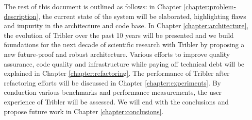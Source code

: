 The rest of this document is outlined as follows: in Chapter \ref{chapter:problem-description}, the current state of the system will be elaborated, highlighting flaws and impurity in the architecture and code base. 
In Chapter \ref{chapter:architecture}, the evolution of Tribler over the past 10 years will be presented and we build foundations for the next decade of scientific research with Tribler by proposing a new future-proof and robust architecture.
Various efforts to improve quality assurance, code quality and infrastructure while paying off technical debt will be explained in Chapter \ref{chapter:refactoring}.
The performance of Tribler after refactoring efforts will be discussed in Chapter \ref{chapter:experiments}.
By conduction various benchmarks and performance measurements, the user experience of Tribler will be assessed.
We will end with the conclusions and propose future work in Chapter \ref{chapter:conclusions}.
